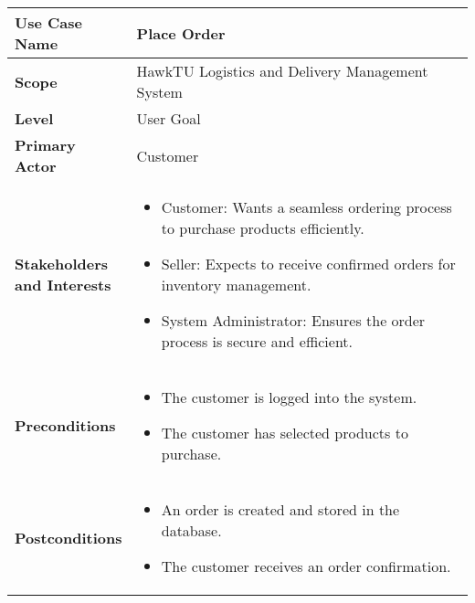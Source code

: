 \documentclass{article}
\begin{document}
\begin{longtable}{|>{\raggedright\arraybackslash}m{0.25\linewidth}|m{0.75\linewidth}|}
\hline
\textbf{Use Case Name} & Place Order \\
\hline
\textbf{Scope} & HawkTU Logistics and Delivery Management System \\
\hline
\textbf{Level} & User Goal \\
\hline
\textbf{Primary Actor} & Customer \\
\hline
\textbf{Stakeholders and Interests} & 
\begin{itemize}
    \item Customer: Wants a seamless ordering process to purchase products efficiently.
    \item Seller: Expects to receive confirmed orders for inventory management.
    \item System Administrator: Ensures the order process is secure and efficient.
\end{itemize} \\
\hline
\textbf{Preconditions} & 
\begin{itemize}
    \item The customer is logged into the system.
    \item The customer has selected products to purchase.
\end{itemize} \\
\hline
\textbf{Postconditions} & 
\begin{itemize}
    \item An order is created and stored in the database.
    \item The customer receives an order confirmation.
\end{itemize} \\
\hline
\end{longtable}

\vspace{-2.45em}
\end{document}
